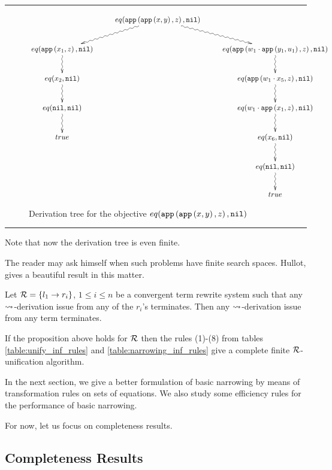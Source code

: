\begin{landscape}
	\thispagestyle{empty}
	\hrule
	\begin{figure}[!ht]
		\begin{displaymath}
			\xymatrix{
				& eq(\appFunc{\appFunc{x}{y}}{z}, \nilList) \ar@{~>}[dr] \ar@{~>}[dl] \\
				eq(\appFunc{x_1}{z},\nilList) \ar@{~>}[d] & & eq(\appFunc{w_1 \cdot \appFunc{y_1}{u_1}}{z}, \nilList) \ar@{~>}[d]\\
				eq(x_2,\nilList) \ar@{~>}[d] & & eq(\appFunc{w_1 \cdot x_5}{z}, \nilList) \ar@{~>}[d]\\
				eq(\nilList, \nilList) \ar@{~>}[d]& & eq(w_1 \cdot \appFunc{x_1}{z}, \nilList) \ar@{~>}[d]\\
				true & & eq(x_6, \nilList) \ar@{~>}[d]\\
				& & eq(\nilList, \nilList) \ar@{~>}[d]\\
				& & true
			}
		\end{displaymath}
		\caption{Derivation tree for the objective $eq(\mathtt{app}\left(\mathtt{app}\left(x,y\right),z\right), \mathtt{nil})$}
		\label{figure:example:app:derivation-tree-basic-narrowing}
	\end{figure}
	\hrule
	\vspace{1cm}
	Note that now the derivation tree is even finite.
\end{landscape}

The reader may ask himself when such problems have finite search spaces. Hullot, \cite{hullot:cfunif} gives a beautiful result in this matter.

\begin{proposition}
	Let $\mathcal{R} = \{ l_1 \rightarrow r_i \}$, $1 \leq i \leq n$ be a convergent term rewrite system such that any $\mathbin{\rightsquigarrow}$-derivation issue from any of the $r_i$'s terminates. Then any $\mathbin{\rightsquigarrow}$-derivation issue from any term terminates.
\end{proposition}

If the proposition above holds for $\mathcal{R}$ then the rules (1)-(8) from tables \ref{table:unify_inf_rules} and \ref{table:narrowing_inf_rules} give a complete finite $\mathcal{R}$-unification algorithm.

In the next section, we give a better formulation of basic narrowing by means of transformation rules on sets of equations. We also study some efficiency rules for the performance of basic narrowing.

For now, let us focus on completeness results.

\subsection{Completeness Results}
